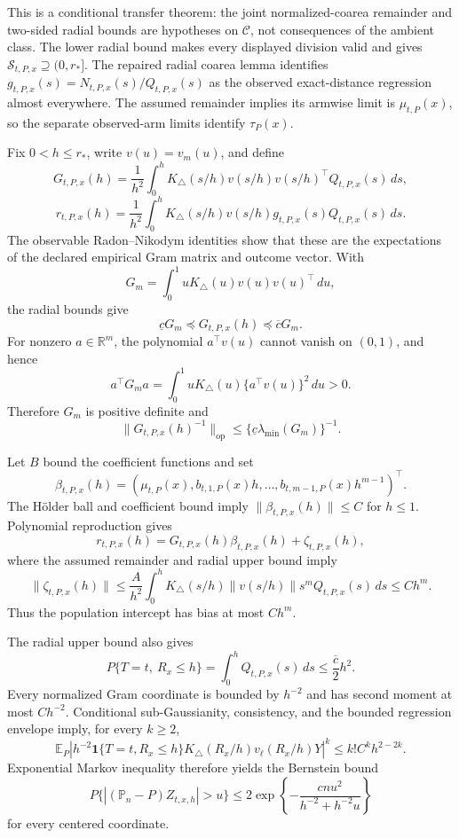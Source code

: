 This is a conditional transfer theorem: the joint normalized-coarea remainder
and two-sided radial bounds are hypotheses on \(\mathcal C\), not consequences
of the ambient class.  The lower radial bound makes every displayed division
valid and gives \(\mathcal S_{t,P,x}\supseteq(0,r_*]\).  The repaired radial
coarea lemma identifies
\(g_{t,P,x}(s)=N_{t,P,x}(s)/Q_{t,P,x}(s)\) as the observed exact-distance
regression almost everywhere.  The assumed remainder implies its armwise limit
is \(\mu_{t,P}(x)\), so the separate observed-arm limits identify
\(\tau_P(x)\).

Fix \(0<h\leq r_*\), write \(v(u)=v_m(u)\), and define
\[
 G_{t,P,x}(h)=\frac1{h^2}\int_0^hK_\triangle(s/h)
 v(s/h)v(s/h)^\top Q_{t,P,x}(s)\,ds,
\]
\[
 r_{t,P,x}(h)=\frac1{h^2}\int_0^hK_\triangle(s/h)
 v(s/h)g_{t,P,x}(s)Q_{t,P,x}(s)\,ds.
\]
The observable Radon--Nikodym identities show that these are the expectations
of the declared empirical Gram matrix and outcome vector.  With
\[
 G_m=\int_0^1uK_\triangle(u)v(u)v(u)^\top\,du,
\]
the radial bounds give
\[
 \underline cG_m\preceq G_{t,P,x}(h)\preceq\overline cG_m.
\]
For nonzero \(a\in\mathbb R^m\), the polynomial \(a^\top v(u)\) cannot vanish
on \((0,1)\), and hence
\[
 a^\top G_ma=\int_0^1uK_\triangle(u)\{a^\top v(u)\}^2\,du>0.
\]
Therefore \(G_m\) is positive definite and
\[
 \lVert G_{t,P,x}(h)^{-1}\rVert_{\mathrm{op}}
 \leq\{\underline c\lambda_{\min}(G_m)\}^{-1}.
\]

Let \(B\) bound the coefficient functions and set
\[
 \beta_{t,P,x}(h)=
 (\mu_{t,P}(x),b_{t,1,P}(x)h,\ldots,
 b_{t,m-1,P}(x)h^{m-1})^\top.
\]
The H\"older ball and coefficient bound imply
\(\lVert\beta_{t,P,x}(h)\rVert\leq C\) for \(h\leq1\).  Polynomial
reproduction gives
\[
 r_{t,P,x}(h)=G_{t,P,x}(h)\beta_{t,P,x}(h)
 +\zeta_{t,P,x}(h),
\]
where the assumed remainder and radial upper bound imply
\[
 \lVert\zeta_{t,P,x}(h)\rVert
 \leq\frac A{h^2}\int_0^hK_\triangle(s/h)
 \lVert v(s/h)\rVert s^mQ_{t,P,x}(s)\,ds
 \leq Ch^m.
\]
Thus the population intercept has bias at most \(Ch^m\).

The radial upper bound also gives
\[
 P\{T=t,\ R_x\leq h\}=\int_0^hQ_{t,P,x}(s)\,ds
 \leq\frac{\overline c}{2}h^2.
\]
Every normalized Gram coordinate is bounded by \(h^{-2}\) and has second
moment at most \(Ch^{-2}\).  Conditional sub-Gaussianity, consistency, and the
bounded regression envelope imply, for every \(k\geq2\),
\[
 \mathbb E_P\left|h^{-2}\mathbf1\{T=t,R_x\leq h\}
 K_\triangle(R_x/h)v_\ell(R_x/h)Y\right|^k
 \leq k!C^kh^{2-2k}.
\]
Exponential Markov inequality therefore yields the Bernstein bound
\[
 P\{|(\mathbb P_n-P)Z_{t,x,h}|>u\}
 \leq2\exp\!\left\{-\frac{cnu^2}{h^{-2}+h^{-2}u}\right\}
\]
for every centered coordinate.

